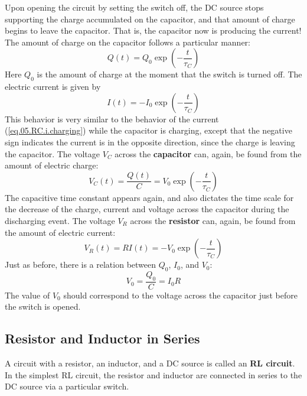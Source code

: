 Upon opening the circuit by setting the switch off, the DC source stops supporting the charge accumulated on the capacitor, and that amount of charge begins to leave the capacitor. That is, the capacitor now is producing the current! The amount of charge on the capacitor follows a particular manner:
\begin{equation}
    Q(t) = Q_{0} \exp\left(-\frac{t}{\tau_{C}}\right)
    \label{eq.05.RC.q.discharging}
\end{equation}
Here $Q_{0}$ is the amount of charge at the moment that the switch is turned off. The electric current is given by
\begin{equation}
    I(t) = - I_{0} \exp\left(-\frac{t}{\tau_{C}}\right)
    \label{eq.05.RC.i.discharging}
\end{equation}
This behavior is very similar to the behavior of the current (\ref{eq.05.RC.i.charging}) while the capacitor is charging, except that the negative sign indicates the current is in the opposite direction, since the charge is leaving the capacitor. The voltage $V_{C}$ across the \textbf{capacitor} can, again, be found from the amount of electric charge:
\begin{equation}
    V_{C}(t) = \frac{Q(t)}{C} = V_{0} \exp\left(-\frac{t}{\tau_{C}}\right)
    \label{eq.05.RC.vC.discharging}
\end{equation}
The capacitive time constant appears again, and also dictates the time scale for the decrease of the charge, current and voltage across the capacitor during the discharging event. The voltage $V_{R}$ across the \textbf{resistor} can, again, be found from the amount of electric current:
\begin{equation}
    V_{R}(t) = R I(t) = - V_{0} \exp\left(-\frac{t}{\tau_{C}}\right)
\end{equation}
Just as before, there is a relation between $Q_{0}$, $I_{0}$, and $V_{0}$:
\begin{equation}
    V_{0} = \frac{Q_{0}}{C} = I_{0} R
\end{equation}
The value of $V_{0}$ should correspond to the voltage across the capacitor just before the switch is opened.
\subsection{Resistor and Inductor in Series}
A circuit with a resistor, an inductor, and a DC source is called an \textbf{RL circuit}. In the simplest RL circuit, the resistor and inductor are connected in series to the DC source via a particular switch.

